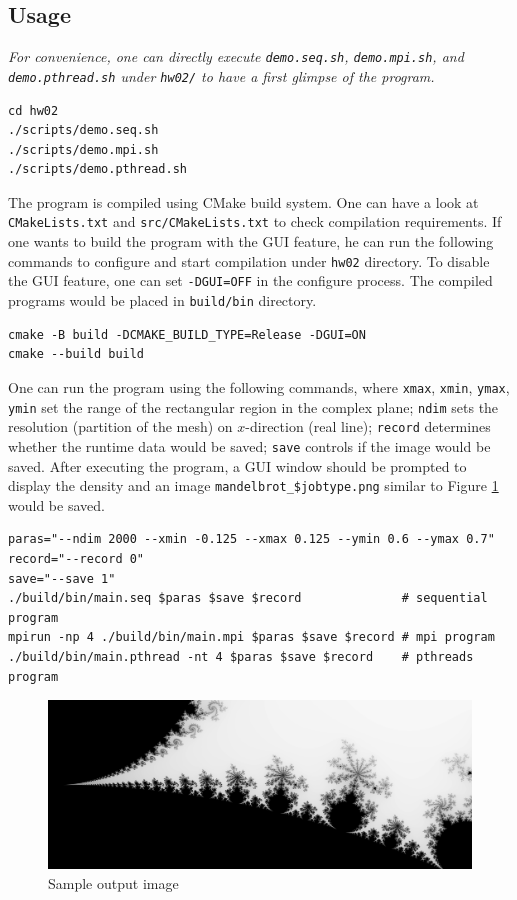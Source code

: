 \documentclass[twoside,12pt]{article}
\theoremstyle{definition}
\theoremstyle{remark}
\begin{document}
\subsection{Usage}
\textit{\color{red}
For convenience, one can directly execute \lstinline|demo.seq.sh|,
\lstinline|demo.mpi.sh|, and \lstinline|demo.pthread.sh| under 
\lstinline|hw02/| to have a first glimpse of the program.
}
\begin{lstlisting}[style=sh]
cd hw02
./scripts/demo.seq.sh
./scripts/demo.mpi.sh
./scripts/demo.pthread.sh
\end{lstlisting}

The program is compiled using CMake build system.
One can have a look at \lstinline|CMakeLists.txt| and \lstinline|src/CMakeLists.txt| 
to check compilation requirements.
If one wants to build the program with the GUI feature, he can run the following commands to
configure and start compilation under \lstinline|hw02| directory.
To disable the GUI feature, one can set \lstinline|-DGUI=OFF| in the configure process.
The compiled programs would be placed in \lstinline|build/bin| directory.
\begin{lstlisting}[style=sh]
cmake -B build -DCMAKE_BUILD_TYPE=Release -DGUI=ON
cmake --build build
\end{lstlisting}

One can run the program using the following commands,
where \lstinline|xmax|, \lstinline|xmin|, \lstinline|ymax|, \lstinline|ymin|
set the range of the rectangular region in the complex plane;
\lstinline|ndim| sets the resolution (partition of the mesh) on
$x$-direction (real line);
\lstinline|record| determines whether the runtime data would be saved;
\lstinline|save| controls if the image would be saved.
After executing the program,
a GUI window should be prompted to display the density
and an image \lstinline|mandelbrot_$jobtype.png| similar to 
Figure \ref{fig:image} would be saved.
\begin{lstlisting}[style=sh]
paras="--ndim 2000 --xmin -0.125 --xmax 0.125 --ymin 0.6 --ymax 0.7"
record="--record 0"
save="--save 1"
./build/bin/main.seq $paras $save $record              # sequential program
mpirun -np 4 ./build/bin/main.mpi $paras $save $record # mpi program   
./build/bin/main.pthread -nt 4 $paras $save $record    # pthreads program
\end{lstlisting}
\begin{figure}[h!]
    \centering
    \includegraphics[width=\textwidth]{../mandelbrot_pt.png}
    \caption{Sample output image}
    \label{fig:image}
\end{figure}
\end{document}
